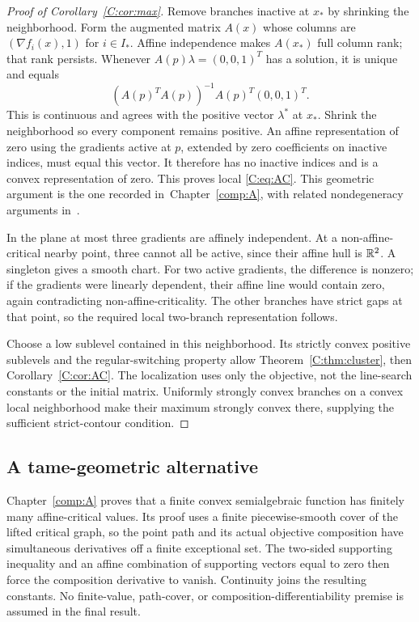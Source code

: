 \begin{proof}[Proof of Corollary~\ref{C:cor:max}]
Remove branches inactive at $x_*$ by shrinking the neighborhood. Form the augmented matrix $A(x)$ whose columns are $(\nabla f_i(x),1)$ for $i\in I_*$. Affine independence makes $A(x_*)$ full column rank; that rank persists. Whenever $A(p)\lambda=(0,0,1)^T$ has a solution, it is unique and equals
\[
 (A(p)^TA(p))^{-1}A(p)^T(0,0,1)^T.
\]
This is continuous and agrees with the positive vector $\lambda^*$ at $x_*$. Shrink the neighborhood so every component remains positive. An affine representation of zero using the gradients active at $p$, extended by zero coefficients on inactive indices, must equal this vector. It therefore has no inactive indices and is a convex representation of zero. This proves local \eqref{C:eq:AC}. This geometric argument is the one recorded in~Chapter~\ref{comp:A}, with related nondegeneracy arguments in~\cite{BG}.

In the plane at most three gradients are affinely independent. At a non-affine-critical nearby point, three cannot all be active, since their affine hull is $\mathbb R^2$. A singleton gives a smooth chart. For two active gradients, the difference is nonzero; if the gradients were linearly dependent, their affine line would contain zero, again contradicting non-affine-criticality. The other branches have strict gaps at that point, so the required local two-branch representation follows.

Choose a low sublevel contained in this neighborhood. Its strictly convex positive sublevels and the regular-switching property allow Theorem~\ref{C:thm:cluster}, then Corollary~\ref{C:cor:AC}. The localization uses only the objective, not the line-search constants or the initial matrix. Uniformly strongly convex branches on a convex local neighborhood make their maximum strongly convex there, supplying the sufficient strict-contour condition.
\end{proof}



\subsection{A tame-geometric alternative}

Chapter~\ref{comp:A} proves that a finite convex semialgebraic function has finitely many affine-critical values. Its proof uses a finite piecewise-smooth cover of the lifted critical graph, so the point path and its actual objective composition have simultaneous derivatives off a finite exceptional set. The two-sided supporting inequality and an affine combination of supporting vectors equal to zero then force the composition derivative to vanish. Continuity joins the resulting constants. No finite-value, path-cover, or composition-differentiability premise is assumed in the final result.

